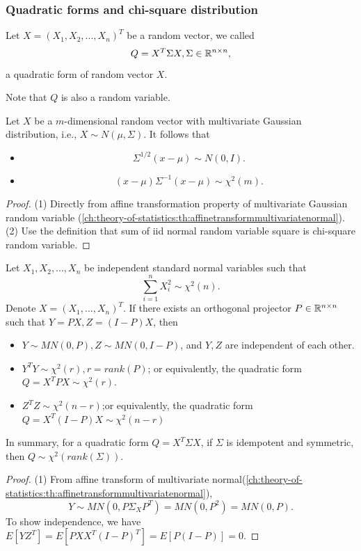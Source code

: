 \begin{refsection}
\subsubsection{Quadratic forms and chi-square distribution}
\begin{definition}\cite[485]{hoggintroduction}
Let $X=(X_1,X_2,...,X_n)^T$ be a random vector, we called $$Q = X^T\Sigma X,\Sigma\in \mathbb{R}^{n\times n},$$
a quadratic form of random vector  $X$.

Note that $Q$ is also a random variable.
\end{definition}

\begin{lemma}
Let $X$ be a $m$-dimensional random vector with multivariate Gaussian distribution, i.e., $X\sim N(\mu, \Sigma)$. It follows that
\begin{itemize}
	\item $$\Sigma^{1/2}(x-\mu)\sim N(0, I).$$
	\item $$(x-\mu)\Sigma^{-1}(x-\mu)\sim \chi^2(m).$$
\end{itemize}	
\end{lemma}
\begin{proof}
(1) Directly from affine transformation property of multivariate Gaussian random variable (\autoref{ch:theory-of-statistics:th:affinetransformmultivariatenormal}). 
(2) Use the definition that sum of iid normal random variable square is chi-square random variable.
\end{proof}


\begin{theorem}\label{ch:theory-of-statistics:th:chi-squareOrthogonalDecomposition}
Let $X_1,X_2,...,X_n$ be independent standard normal variables such that 
$$\sum_{i=1}^n X_i^2 \sim \chi^2(n). $$
Denote $X = (X_1,...,X_n)^T$.
If there exists an orthogonal projector	$P\in \mathbb{R}^{n\times n}$ such that $Y = PX, Z = (I-P)X$, then
\begin{itemize}
	\item $Y \sim MN(0,P), Z\sim MN(0, I-P)$, and $Y,Z$ are independent of each other.  
	\item $Y^TY \sim \chi^2(r), r = rank(P)$; or equivalently, the quadratic form $Q = X^TPX\sim \chi^2(r)$.
	\item $Z^TZ \sim \chi^2(n-r)$;or equivalently, the quadratic form $Q = X^T(I-P)X\sim \chi^2(n-r)$
\end{itemize} 
In summary, for a quadratic form $Q = X^T\Sigma X$, if $\Sigma$ is idempotent and symmetric, then $Q\sim \chi^2(rank(\Sigma))$.
\end{theorem}
\begin{proof}
(1) From affine transform of multivariate normal(\autoref{ch:theory-of-statistics:th:affinetransformmultivariatenormal}), $$Y\sim MN(0, P\Sigma_X P^T) = MN(0, P^2) = MN(0,P).$$
To show independence, we have $E[YZ^T] = E[PXX^T(I-P)^T] = E[P(I-P)] = 0$.


\end{proof}
\end{refsection}
